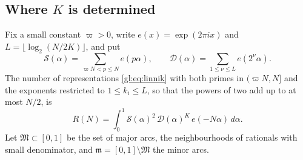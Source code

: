 \subsection{Where \texorpdfstring{$K$}{K} is determined}\label{gl:sec:where}\label{gl:sec:oct}

Fix a small constant $\varpi>0$, write $e(x)=\exp(2\pi ix)$ and $L=\lfloor\log_2(N/2K)\rfloor$, and put
\[
\mathcal S(\alpha)=\sum_{\varpi N<p\le N}e(p\alpha),\qquad \mathcal D(\alpha)=\sum_{1\le\nu\le L}e(2^\nu\alpha).
\]
The number of representations \eqref{gl:eq:linnik} with both primes in $(\varpi N,N]$ and the exponents restricted to $1\le k_i\le L$, so that the powers of two add up to at most $N/2$, is
\begin{equation}\label{gl:eq:circle}
R(N)=\int_0^1 \mathcal S(\alpha)^2\,\mathcal D(\alpha)^K\,e(-N\alpha)\,d\alpha .
\end{equation}
Let $\mathfrak M\subset[0,1]$ be the set of major arcs, the neighbourhoods of rationals with small denominator, and $\mathfrak m=[0,1]\setminus\mathfrak M$ the minor arcs.

